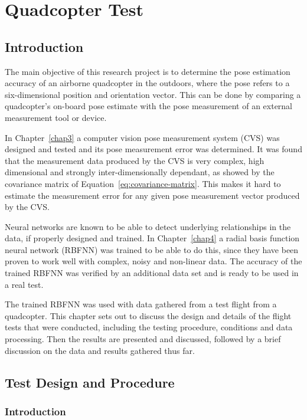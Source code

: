 \chapter{Quadcopter Test}
\label{chap5}

\section{Introduction}

The main objective of this research project is to determine the pose estimation accuracy of an airborne quadcopter in the outdoors, where the pose refers to a six-dimensional position and orientation vector. This can be done by comparing a quadcopter's on-board pose estimate with the pose measurement of an external measurement tool or device.  

In Chapter~\ref{chap3} a computer vision pose measurement system (CVS) was designed and tested and its pose measurement error was determined. It was found that the measurement data produced by the CVS is very complex, high dimensional and strongly inter-dimensionally dependant, as showed by the covariance matrix of Equation~\ref{eq:covariance-matrix}. This makes it hard to estimate the measurement error for any given pose measurement vector produced by the CVS.\@ 

Neural networks are known to be able to detect underlying relationships in the data, if properly designed and trained. In Chapter~\ref{chap4} a radial basis function neural network (RBFNN) was trained to be able to do this, since they have been proven to work well with complex, noisy and non-linear data. The accuracy of the trained RBFNN was verified by an additional data set and is ready to be used in a real test. 

The trained RBFNN was used with data gathered from a test flight from a quadcopter. This chapter sets out to discuss the design and details of the flight tests that were conducted, including the testing procedure, conditions and data processing. Then the results are presented and discussed, followed by a brief discussion on the data and results gathered thus far. 

\section{Test Design and Procedure}

\subsection{Introduction}

